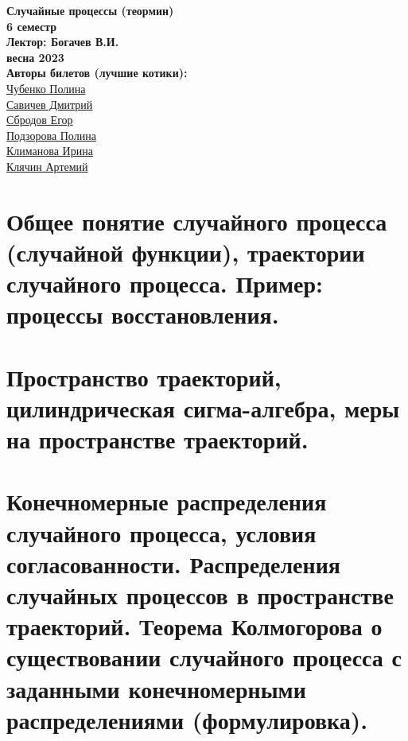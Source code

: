 


    \thispagestyle{empty}
    \BgThispage
    \begin{center}
        \vspace*{4cm}
        
        \Huge
        \textbf{Случайные процессы (теормин)} \\
        \textbf{6 семестр} \\
        \textbf{Лектор: Богачев В.И.} \\
        \textbf{весна 2023} \\
        
        \vspace{7cm}
        \Large
        \textbf{Авторы билетов (лучшие котики):} \\
        \href{https://vk.com/poli.dobro}{Чубенко Полина} \\ 
        \href{https://vk.com/dimasav123}{Савичев Дмитрий} \\
        \href{https://vk.com/ulegor}{Сбродов Егор} \\
        \href{https://vk.com/id165779384}{Подзорова Полина} \\      
        \href{https://vk.com/meraklim}{Климанова Ирина} \\
        \href{https://vk.com/artemiy.kliachin}{Клячин Артемий} \\ 
    \end{center}
\newpage

\tableofcontents
\newpage


\section{Общее понятие случайного процесса (случайной функции), траектории случайного процесса. Пример: процессы восстановления.}

\newpage{}

\section{Пространство траекторий, цилиндрическая сигма-алгебра, меры на пространстве траекторий.}

\newpage{}

\section{Конечномерные распределения случайного процесса, условия согласованности. Распределения случайных процессов в пространстве траекторий. Теорема Колмогорова о существовании случайного процесса с заданными конечномерными распределениями (формулировка).}

\newpage{}

